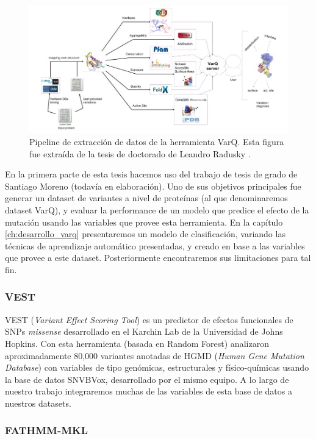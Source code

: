 \begin{figure}[H]
    \centering
    \includegraphics[scale=0.45]{documents/latex/figures/1/pipeline.png}
    \caption{Pipeline de extracción de datos de la herramienta VarQ. Esta figura fue extraída de la tesis de doctorado de Leandro Radusky \cite{Radusky2017}.}
    \label{fig:varq_pipeline}
\end{figure}

En la primera parte de esta tesis hacemos uso del trabajo de tesis de grado de Santiago Moreno (todavía en elaboración). Uno de sus objetivos principales fue generar un dataset de variantes a nivel de proteínas (al que denominaremos dataset VarQ), y evaluar la performance de un modelo que predice el efecto de la mutación usando las variables que provee esta herramienta. En la capítulo \ref{ch:desarrollo_varq} presentaremos un modelo de clasificación, variando las técnicas de aprendizaje automático presentadas, y creado en base a las variables que provee a este dataset. Posteriormente encontraremos sus limitaciones para tal fin.

\subsubsection{VEST}

VEST (\textit{Variant Effect Scoring Tool}) \cite{Carter2013} es un predictor de efectos funcionales de SNPs \textit{missense} desarrollado en el Karchin Lab de la Universidad de Johns Hopkins. Con esta herramienta (basada en Random Forest) analizaron aproximadamente 80,000 variantes anotadas de HGMD (\textit{Human Gene Mutation Database}) con variables de tipo genómicas, estructurales y físico-químicas usando la base de datos SNVBVox, desarrollado por el mismo equipo. A lo largo de nuestro trabajo integraremos muchas de las variables de esta base de datos a nuestros datasets.

\subsubsection{FATHMM-MKL}

